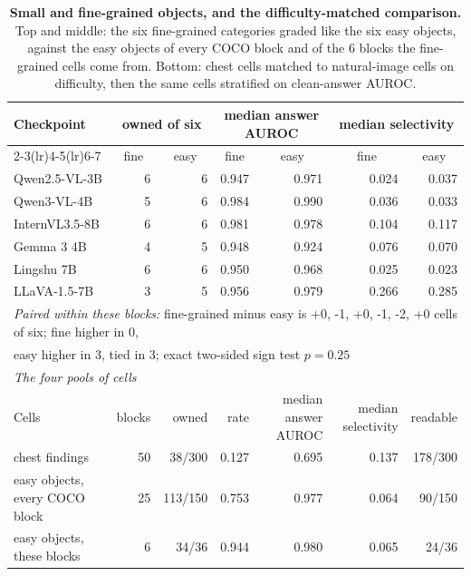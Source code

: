 \begin{table}[htbp]
\centering
\scriptsize
\setlength{\tabcolsep}{4pt}
\setlength{\abovecaptionskip}{2pt}
\setlength{\belowcaptionskip}{0pt}
\renewcommand{\arraystretch}{0.95}
\caption{\textbf{Small and fine-grained objects, and the difficulty-matched comparison.} Top and middle: the six fine-grained categories graded like the six easy objects, against the easy objects of every COCO block and of the 6 blocks the fine-grained cells come from. Bottom: chest cells matched to natural-image cells on difficulty, then the same cells stratified on clean-answer AUROC.}
\label{tab:cf-fgobj}
\begin{tabular}{lrrrrrr}
\toprule
\multirow{2}{*}{Checkpoint} & \multicolumn{2}{c}{owned of six} & \multicolumn{2}{c}{median answer AUROC} & \multicolumn{2}{c}{median selectivity}\\
\cmidrule(lr){2-3}\cmidrule(lr){4-5}\cmidrule(lr){6-7}
& \multicolumn{1}{c}{fine} & \multicolumn{1}{c}{easy} & \multicolumn{1}{c}{fine} & \multicolumn{1}{c}{easy} & \multicolumn{1}{c}{fine} & \multicolumn{1}{c}{easy}\\
\midrule
Qwen2.5-VL-3B & 6 & 6 & 0.947 & 0.971 & 0.024 & 0.037 \\
Qwen3-VL-4B & 5 & 6 & 0.984 & 0.990 & 0.036 & 0.033 \\
InternVL3.5-8B & 6 & 6 & 0.981 & 0.978 & 0.104 & 0.117 \\
Gemma 3 4B & 4 & 5 & 0.948 & 0.924 & 0.076 & 0.070 \\
Lingshu 7B & 6 & 6 & 0.950 & 0.968 & 0.025 & 0.023 \\
LLaVA-1.5-7B & 3 & 5 & 0.956 & 0.979 & 0.266 & 0.285 \\
\midrule
\multicolumn{7}{l}{\textit{Paired within these blocks:} fine-grained minus easy is +0, -1, +0, -1, -2, +0 cells of six; fine higher in 0,} \\
\multicolumn{7}{l}{easy higher in 3, tied in 3; exact two-sided sign test $p=0.25$} \\
\midrule
\multicolumn{7}{l}{\textit{The four pools of cells}} \\
Cells & blocks & owned & rate & median answer AUROC & median selectivity & readable \\
\midrule
chest findings & 50 & 38/300 & 0.127 & 0.695 & 0.137 & 178/300 \\
easy objects, every COCO block & 25 & 113/150 & 0.753 & 0.977 & 0.064 & 90/150 \\
easy objects, these blocks & 6 & 34/36 & 0.944 & 0.980 & 0.065 & 24/36 \\

\end{tabular}
\end{table}
